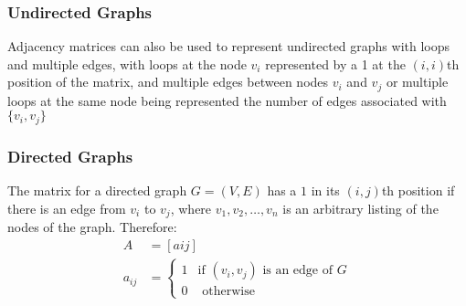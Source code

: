 \documentclass[12pt letter]{report}
\begin{document}
\subsubsection{Undirected Graphs}
Adjacency matrices can also be used to represent undirected graphs with loops and multiple edges, with loops at the
node $v_i$ represented by a 1 at the $\left( i, i \right) $th position of the matrix, and multiple edges between nodes
$v_i$ and $v_j$ or multiple loops at the same node being represented the number of edges associated with $\{v_i, v_j\} $


\subsubsection{Directed Graphs}

The matrix for a directed graph $G = \left( V, E \right) $ has a $1$ in its $\left( i, j \right) $th position if there
is an edge from $v_i$ to $v_j$, where $v_1, v_2, \ldots, v_n$ is an arbitrary listing of the nodes of the graph.
Therefore:
\begin{align*}
  A      & = \left[ aij \right]                                              \\
  a_{ij} & = \begin{cases}
               1 & \text{if } \left( v_i, v_j \right) \text{ is an edge of } G \\
               0 & \text{ otherwise}
             \end{cases}
\end{align*}
\end{document}
